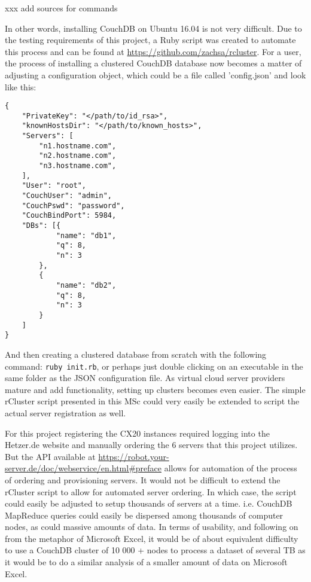 xxx add sources for commands

In other words, installing CouchDB on Ubuntu 16.04 is not very difficult. Due to the testing requirements of this project, a Ruby script was created to automate this process and can be found at \url{https://github.com/zachsa/rcluster}. For a user, the process of installing a clustered CouchDB database now becomes a matter of adjusting a configuration object, which could be a file called 'config.json' and look like this:

\begin{verbatim}
{
    "PrivateKey": "</path/to/id_rsa>",
    "knownHostsDir": "</path/to/known_hosts>",
    "Servers": [
        "n1.hostname.com",
        "n2.hostname.com",
        "n3.hostname.com",
    ],
    "User": "root",
    "CouchUser": "admin",
    "CouchPswd": "password",
    "CouchBindPort": 5984,
    "DBs": [{
            "name": "db1",
            "q": 8,
            "n": 3
        },
        {
            "name": "db2",
            "q": 8,
            "n": 3
        }
    ]
}
\end{verbatim}

And then creating a clustered database from scratch with the following command: \texttt{ruby init.rb}, or perhaps just double clicking on an executable in the same folder as the JSON configuration file. As virtual cloud server providers mature and add functionality, setting up clusters becomes even easier. The simple rCluster script presented in this MSc could very easily be extended to script the actual server registration as well.

For this project registering the CX20 instances required logging into the Hetzer.de website and manually ordering the 6 servers that this project utilizes. But the API available at \url{https://robot.your-server.de/doc/webservice/en.html#preface} allows for automation of the process of ordering and provisioning servers. It would not be difficult to extend the rCluster script to allow for automated server ordering. In which case, the script could easily be adjusted to setup thousands of servers at a time. i.e. CouchDB MapReduce queries could easily be dispersed among thousands of computer nodes, as could massive amounts of data. In terms of usability, and following on from the metaphor of Microsoft Excel, it would be of about equivalent difficulty to use a CouchDB cluster of 10 000 + nodes to process a dataset of several TB as it would be to do a similar analysis of a smaller amount of data on Microsoft Excel.

